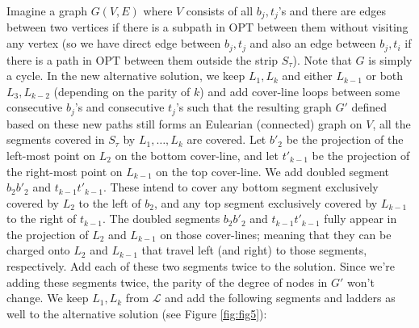 \documentclass[10pt,a4paper]{amsart}
\theoremstyle{thmstyleone}
\newcommand{\OPT}{{\text{OPT}}}
\begin{document}
    Imagine a graph $G(V,E)$ where $V$ consists of all $b_j,t_j$'s and there are edges between two vertices if there is a subpath in $\OPT$ between them without visiting any vertex (so we have direct edge between $b_j,t_j$ and also an edge between $b_j,t_i$ if there is a path in $\OPT$ between them outside the strip  $S_\tau$).
    Note that $G$ is simply a cycle. In the new alternative solution, we keep $L_1,L_k$ and either $L_{k-1}$ or both $L_3,L_{k-2}$ (depending on the parity of $k$) and add
    cover-line loops between some consecutive $b_j$'s and consecutive $t_j$'s such that the resulting graph $G'$ defined based on these new paths still forms an Eulearian (connected) graph on $V$, all the segments covered in $S_\tau$ by  $L_1,\ldots,L_k$ are covered.
 Let $b'_2$ be the projection of the left-most point on $L_2$ on the bottom cover-line, and let $t'_{k - 1}$ be the projection of the right-most point on $L_{k - 1}$ on the top cover-line. 
    We add doubled segment $b_2b'_2$ and $t_{k-1}t'_{k-1}$. These intend to cover any bottom segment exclusively covered by $L_2$ to the left of $b_2$, and any top segment exclusively covered by $L_{k-1}$ to the right of $t_{k-1}$. 
The doubled segments $b_2b'_2$ and $t_{k - 1}t'_{k - 1}$ fully appear in the projection of $L_2$ and $L_{k - 1}$ on those cover-lines; meaning that they can be charged onto $L_2$ and $L_{k - 1}$ that travel left (and right)  to those segments, respectively. Add each of these two segments twice to the solution. Since we're adding these segments twice, the parity of the degree of nodes in $G'$ won't change. 
    We keep $L_1,L_k$ from $\mathcal L$ and add the following segments and ladders as well to the alternative solution (see Figure \ref{fig:fig5}):
\end{document}
